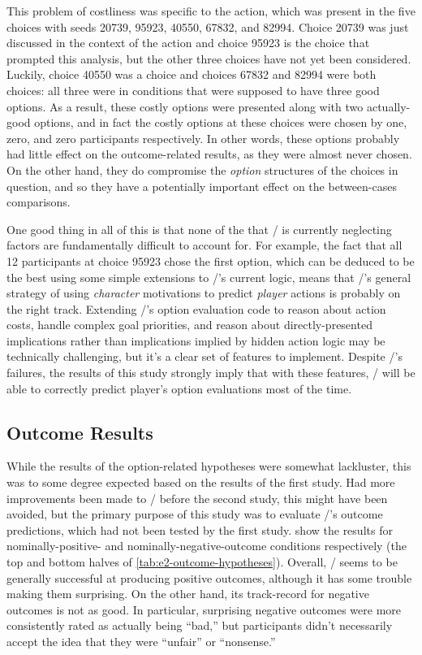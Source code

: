 This problem of costliness was specific to the  action, which was present in the five choices with seeds 20739, 95923, 40550, 67832, and 82994.
%
Choice 20739 was just discussed in the context of the  action and choice 95923 is the choice that prompted this analysis, but the other three choices have not yet been considered.
%
Luckily, choice 40550 was a \unxf{} choice and choices 67832 and 82994 were both \exps{} choices: all three were in conditions that were supposed to have three good options.
%
As a result, these costly options were presented along with two actually-good options, and in fact the costly options at these choices were chosen by one, zero, and zero participants respectively.
%
In other words, these options probably had little effect on the outcome-related results, as they were almost never chosen.
%
On the other hand, they do compromise the \emph{option} structures of the choices in question, and so they have a potentially important effect on the between-cases comparisons.


One good thing in all of this is that none of the that \dunyazad/ is currently neglecting factors are fundamentally difficult to account for.
%
For example, the fact that all 12 participants at choice 95923 chose the first option, which can be deduced to be the best using some simple extensions to \dunyazad/'s current logic, means that \dunyazad/'s general strategy of using \emph{character} motivations to predict \emph{player} actions is probably on the right track.
%
Extending \dunyazad/'s option evaluation code to reason about action costs, handle complex goal priorities, and reason about directly-presented implications rather than implications implied by hidden action logic may be technically challenging, but it's a clear set of features to implement.
%
Despite \dunyazad/'s failures, the results of this study strongly imply that with these features, \dunyazad/ will be able to correctly predict player's option evaluations most of the time.


\subsection{Outcome Results}

While the results of the option-related hypotheses were somewhat lackluster, this was to some degree expected based on the results of the first study.
%
Had more improvements been made to \dunyazad/ before the second study, this might have been avoided, but the primary purpose of this study was to evaluate \dunyazad/'s outcome predictions, which had not been tested by the first study.
%
 show the results for nominally-positive- and nominally-negative-outcome conditions respectively (the top and bottom halves of \cref{tab:e2-outcome-hypotheses}).
%
Overall, \dunyazad/ seems to be generally successful at producing positive outcomes, although it has some trouble making them surprising.
%
On the other hand, its track-record for negative outcomes is not as good.
%
In particular, surprising negative outcomes were more consistently rated as actually being ``bad,'' but participants didn't necessarily accept the idea that they were ``unfair'' or ``nonsense.''

